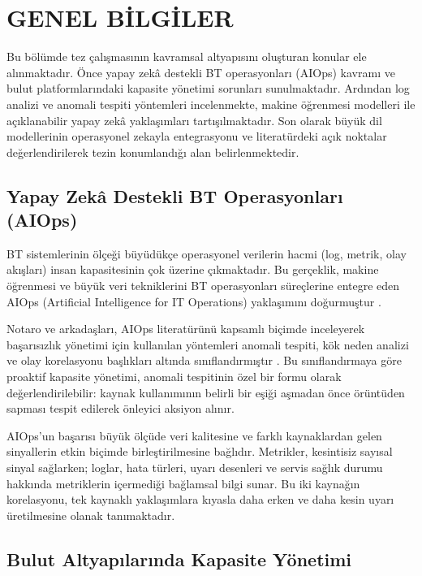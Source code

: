 \chapter{GENEL BİLGİLER}
\label{ch:genelbilgiler}

Bu bölümde tez çalışmasının kavramsal altyapısını oluşturan konular ele alınmaktadır.
Önce yapay zekâ destekli BT operasyonları (AIOps) kavramı ve bulut platformlarındaki kapasite yönetimi sorunları sunulmaktadır.
Ardından log analizi ve anomali tespiti yöntemleri incelenmekte, makine öğrenmesi modelleri ile açıklanabilir yapay zekâ yaklaşımları tartışılmaktadır.
Son olarak büyük dil modellerinin operasyonel zekayla entegrasyonu ve literatürdeki açık noktalar değerlendirilerek tezin konumlandığı alan belirlenmektedir.


\section{Yapay Zekâ Destekli BT Operasyonları (AIOps)}

BT sistemlerinin ölçeği büyüdükçe operasyonel verilerin hacmi (log, metrik, olay akışları) insan kapasitesinin çok üzerine çıkmaktadır.
Bu gerçeklik, makine öğrenmesi ve büyük veri tekniklerini BT operasyonları süreçlerine entegre eden AIOps (Artificial Intelligence for IT Operations) yaklaşımını doğurmuştur \autocite{dang2019}.

Notaro ve arkadaşları, AIOps literatürünü kapsamlı biçimde inceleyerek başarısızlık yönetimi için kullanılan yöntemleri anomali tespiti, kök neden analizi ve olay korelasyonu başlıkları altında sınıflandırmıştır \autocite{notaro2021}.
Bu sınıflandırmaya göre proaktif kapasite yönetimi, anomali tespitinin özel bir formu olarak değerlendirilebilir: kaynak kullanımının belirli bir eşiği aşmadan önce örüntüden sapması tespit edilerek önleyici aksiyon alınır.

AIOps'un başarısı büyük ölçüde veri kalitesine ve farklı kaynaklardan gelen sinyallerin etkin biçimde birleştirilmesine bağlıdır.
Metrikler, kesintisiz sayısal sinyal sağlarken; loglar, hata türleri, uyarı desenleri ve servis sağlık durumu hakkında metriklerin içermediği bağlamsal bilgi sunar.
Bu iki kaynağın korelasyonu, tek kaynaklı yaklaşımlara kıyasla daha erken ve daha kesin uyarı üretilmesine olanak tanımaktadır.


\section{Bulut Altyapılarında Kapasite Yönetimi}

